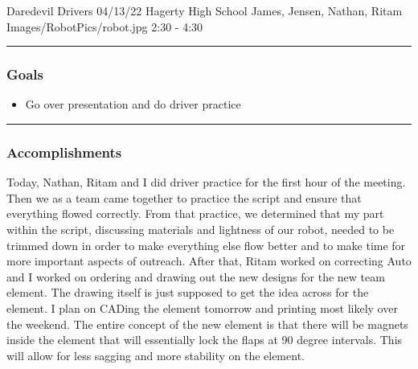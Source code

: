 \insertmeeting 
	{Daredevil Drivers} 
	{04/13/22} 
	{Hagerty High School}
	{James, Jensen, Nathan, Ritam}
	{Images/RobotPics/robot.jpg}
	{2:30 - 4:30}
	
\noindent\hfil\rule{\textwidth}{.4pt}\hfil
\subsubsection*{Goals}
\begin{itemize}
    \item Go over presentation and do driver practice

\end{itemize} 

\noindent\hfil\rule{\textwidth}{.4pt}\hfil

\subsubsection*{Accomplishments}
Today, Nathan, Ritam and I did driver practice for the first hour of the meeting. Then we as a team came together to practice the script and ensure that everything flowed correctly. From that practice, we determined that my part within the script, discussing materials and lightness of our robot, needed to be trimmed down in order to make everything else flow better and to make time for more important aspects of outreach. After that, Ritam worked on correcting Auto and I worked on ordering and drawing out the new designs for the new team element. The drawing itself is just supposed to get the idea across for the element. I plan on CADing the element tomorrow and printing most likely over the weekend. The entire concept of the new element is that there will be magnets inside the element that will essentially lock the flaps at 90 degree intervals. This will allow for less sagging and more stability on the element.


	
